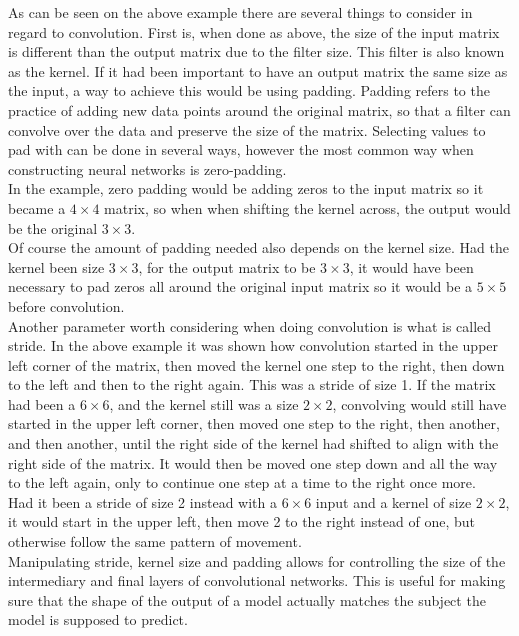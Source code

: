 \begin{multicols}{2}
As can be seen on the above example there are several things to consider in regard to convolution. First is, when done as above, the size of the input matrix is different than the output matrix due to the filter size. This filter is also known as the kernel. If it had been important to have an output matrix the same size as the input, a way to achieve this would be using padding. Padding refers to the practice of adding new data points around the original matrix, so that a filter can convolve over the data and preserve the size of the matrix. Selecting values to pad with can be done in several ways, however the most common way when constructing neural networks is zero-padding. \\
In the example, zero padding would be adding zeros to the input matrix so it became a $4\times4$ matrix, so when when shifting the kernel across, the output would be the original $3\times3$. \\
Of course the amount of padding needed also depends on the kernel size. Had the kernel been size $3\times3$, for the output matrix to be $3\times3$, it would have been necessary to pad zeros all around the original input matrix so it would be a $5\times5$ before convolution. \\
Another parameter worth considering when doing convolution is what is called stride. In the above example it was shown how convolution started in the upper left corner of the matrix, then moved the kernel one step to the right, then down to the left and then to the right again. This was a stride of size 1. If the matrix had been a $6\times6$, and the kernel still was a size $2\times2$, convolving would still have started in the upper left corner, then moved one step to the right, then another, and then another, until the right side of the kernel had shifted to align with the right side of the matrix. It would then be moved one step down and all the way to the left again, only to continue one step at a time to the right once more. \\
Had it been a stride of size 2 instead with a $6\times6$ input and a kernel of size $2\times2$, it would start in the upper left, then move 2 to the right instead of one, but otherwise follow the same pattern of movement. \citep[ch. 9]{goodfellow-et-al-2016} \\
Manipulating stride, kernel size and padding allows for controlling the size of the intermediary and final layers of convolutional networks. This is useful for making sure that the shape of the output of a model actually matches the subject the model is supposed to predict.


\end{multicols}
